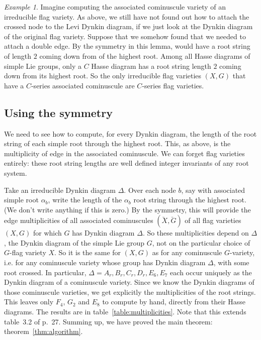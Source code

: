 \documentclass[a4paper,10pt]{amsart}
\theoremstyle{remark}
\newtheorem{example}{Example}
\renewcommand*{\aa}{\alpha}
\begin{document}
\begin{example}
Imagine computing the associated cominuscule variety of an irreducible flag variety.
As above, we still have not found out how to attach the crossed node to the Levi Dynkin diagram, if we just look at the Dynkin diagram of the original flag variety.
Suppose that we somehow found that we needed to attach a double edge.
By the symmetry in this lemma, would have a root string of length \(2\) coming down from of the highest root.
Among all Hasse diagrams of simple Lie groups, only a \(C\) Hasse diagram has a root string length \(2\) coming down from its highest root.
So the only irreducible flag varieties \((X,G)\) that have a \(C\)-series associated cominuscule are \(C\)-series flag varieties.
\end{example}
\subsection{Using the symmetry}
We need to see how to compute, for every Dynkin diagram, the length of the root string of each simple root through the highest root.
This, as above, is the multiplicity of edge in the associated cominuscule.
We can forget flag varieties entirely: these root string lengths are well defined integer invariants of any root system.

Take an irreducible Dynkin diagram \(\Delta\).
Over each node \(b\), say with associated simple root \(\aa_b\), write the length of the \(\aa_b\) root string through the highest root.
(We don't write anything if this is zero.)
By the symmetry, this will provide the edge multiplicities of all associated cominuscules \((\breve X,\breve G)\) of all flag varieties \((X,G)\) for which \(G\) has Dynkin diagram \(\Delta\). 
So these multiplicities depend on \(\Delta\), the Dynkin diagram of the simple Lie group \(G\), not on the particular choice of \(G\)-flag variety \(X\).
So it is the same for \((X,G)\) as for any cominuscule \(G\)-variety, i.e. for any cominuscule variety whose group has Dynkin diagram \(\Delta\), with some root crossed.
In particular, \(\Delta=A_r,B_r,C_r,D_r,E_6,E_7\) each occur uniquely as the Dynkin diagram of a cominuscule variety.
Since we know the Dynkin diagrams of those cominuscule varieties, we get explicitly the multiplicities of the root strings.
This leaves only \(F_4\), \(G_2\) and \(E_8\) to compute by hand, directly from their Hasse diagrams.
The results are in table~\vref{table:multiplicities}.
Note that this extends table~3.2 of \cite{Baston/Eastwood:1989} p.~27.
Summing up, we have proved the main theorem: theorem~\vref{thm:algorithm}.
\end{document}

